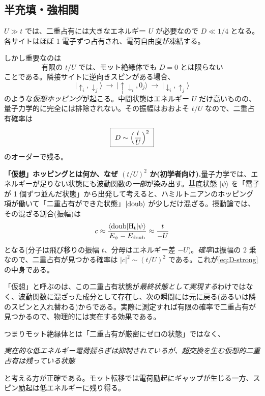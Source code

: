 \documentclass[11pt,a4paper]{ltjsarticle}
\newcommand{\bra}[1]{\langle #1|}
\newcommand{\ket}[1]{|#1\rangle}
\newcommand{\up}{\uparrow}
\newcommand{\dn}{\downarrow}
\begin{document}
\subsection{半充填・強相関}
$U\gg t$ では、二重占有には大きなエネルギー $U$ が必要なので $D\ll1/4$ となる。各サイトはほぼ 1 電子ずつ占有され、電荷自由度が凍結する。

しかし重要なのは
\begin{equation}
  \boxed{\ \text{有限の } t/U \text{ では、モット絶縁体でも } D=0 \text{ とは限らない}\ }
\end{equation}
ことである。隣接サイトに逆向きスピンがある場合、
\begin{equation}
  \ket{\up_i,\dn_j}\ \to\ \ket{\up\dn_i,0_j}\ \to\ \ket{\dn_i,\up_j}
\end{equation}
のような\emph{仮想ホッピング}が起こる。中間状態はエネルギー $U$ だけ高いものの、量子力学的に完全には排除されない。その振幅はおおよそ $t/U$ なので、二重占有確率は
\begin{equation}
  \boxed{\ D\sim\Bigl(\frac{t}{U}\Bigr)^{2}\ }
  \label{eq:D-strong}
\end{equation}
のオーダーで残る。

\begin{keybox}
\textbf{「仮想」ホッピングとは何か、なぜ $(t/U)^2$ か(初学者向け).}量子力学では、エネルギーが足りない状態にも波動関数の\emph{一部}が染み出す。基底状態 $\ket{\psi}$ を「電子が 1 個ずつ並んだ状態」から出発して考えると、ハミルトニアンのホッピング項が働いて「二重占有ができた状態」$\ket{\rm doub}$ が少しだけ混ざる。摂動論では、その混ざる割合(振幅)は
\[
  c \approx \frac{\bra{\rm doub}H_t\ket{\psi}}{E_\psi - E_{\rm doub}} \approx \frac{t}{-U}
\]
となる(分子は飛び移りの振幅 $t$、分母はエネルギー差 $-U$)。\emph{確率}は振幅の 2 乗なので、二重占有が見つかる確率は $|c|^2\sim(t/U)^2$ である。これが\eqref{eq:D-strong}の中身である。

「仮想」と呼ぶのは、この二重占有状態が\emph{最終状態として実現する}わけではなく、波動関数に混ざった成分として存在し、次の瞬間には元に戻る(あるいは隣のスピンと入れ替わる)からである。実際に測定すれば有限の確率で二重占有が見つかるので、物理的には実在する効果である。
\end{keybox}

つまりモット絶縁体とは「二重占有が厳密にゼロの状態」ではなく、
\begin{center}
\emph{実在的な低エネルギー電荷揺らぎは抑制されているが、超交換を生む仮想的二重占有は残っている状態}
\end{center}
と考える方が正確である。モット転移では電荷励起にギャップが生じる一方、スピン励起は低エネルギーに残り得る。
\end{document}
